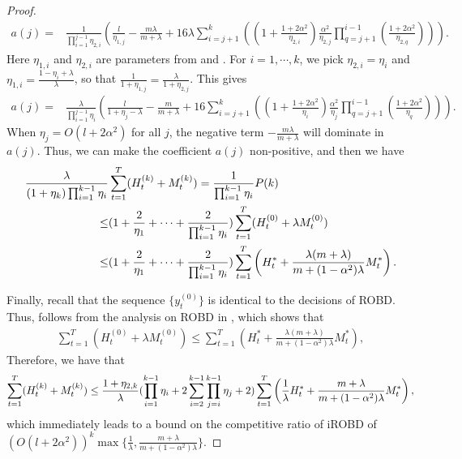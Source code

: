 \begin{proof}
\begin{align}
    a(j)=&\frac{1}{\prod_{i=1}^{j-1}\eta_{2,i}}\left(\frac{l}{\eta_{1,j}}-\frac{m\lambda}{m+\lambda}+16\lambda\sum_{i=j+1}^k\left(\left(1+\frac{1+2\alpha^2}{\eta_{2,i}}\right)\frac{\alpha^2}{\eta_{2,j}}\prod_{q=j+1}^{i-1}\left(\frac{1+2\alpha^2}{\eta_{2,q}}\right)\right)\right).
\end{align}
Here $\eta_{1,i}$ and $\eta_{2,i}$ are parameters from  and . For $i=1,\cdots,k$, we pick $\eta_{2,i}=\eta_{i}$ and $\eta_{1,i}=\frac{1-\eta_{i}+\lambda}{\lambda}$, so that $\frac{1}{1+\eta_{1,j}}=\frac{\lambda}{1+\eta_{2,j}}$. This gives
\begin{align}\label{a.a.coefficient}
    a(j)=&\frac{\lambda}{\prod_{i=1}^{j-1}\eta_{i}}\left(\frac{l}{1+\eta_{j}-\lambda}-\frac{m}{m+\lambda}+16\sum_{i=j+1}^k\left(\left(1+\frac{1+2\alpha^2}{\eta_{i}}\right)\frac{\alpha^2}{\eta_{j}}\prod_{q=j+1}^{i-1}\left(\frac{1+2\alpha^2}{\eta_{q}}\right)\right)\right).
\end{align}
When $\eta_{j}=O(l+2\alpha^2)$ for all $j$, the negative term $-\frac{m\lambda}{m+\lambda}$ will dominate in $a(j)$. Thus, we can make the coefficient $a(j)$ non-positive, and then we have
\begin{subequations}
\begin{align}
    \frac{\lambda}{(1+\eta_{k})\prod_{i=1}^{k-1}\eta_{i}}&\sum_{t=1}^T(H_t^{(k)}+M_t^{(k)})
=\frac{1}{\prod_{i=1}^{k-1}\eta_{i}}P(k)\notag\\
\le&(1+\frac{2}{\eta_{1}}+\cdots+\frac{2}{\prod_{i=1}^{k-1}\eta_{i}})\sum_{t=1}^T(H_t^{(0)}+\lambda M_t^{(0)})\notag\\
\le&(1+\frac{2}{\eta_{1}}+\cdots+\frac{2}{\prod_{i=1}^{k-1}\eta_{i}})\sum_{t=1}^T\left(H_t^*+\frac{\lambda(m+\lambda)}{m+(1-\alpha^2)\lambda}M_t^*\right).\label{appendix.a.last}
\end{align}
\end{subequations}

Finally, recall that the sequence $\{y_t^{(0)}\}$ is identical to the decisions of ROBD. Thus,  follows from the analysis on ROBD in \citep{shi2020online}, which shows that
\begin{align}\label{appendix.a.5}
    \sum_{t=1}^T(H_t^{(0)}+\lambda M_t^{(0)})\le\sum_{t=1}^T\left(H_t^*+\frac{\lambda(m+\lambda)}{m+(1-\alpha^2)\lambda}M_t^*\right),
\end{align}
Therefore, we have that
\begin{align}
    \sum_{t=1}^T(H_t^{(k)}+M_t^{(k)})\le\frac{1+\eta_{2,k}}{\lambda}(\prod_{i=1}^{k-1}\eta_{i}+2\sum_{i=2}^{k-1}\prod_{j=i}^{k-1}\eta_{j}+2)\sum_{t=1}^T\left(\frac{1}{\lambda}H_t^*+\frac{m+\lambda}{m+(1-\alpha^2)\lambda}M_t^*\right),\notag
\end{align}
which immediately leads to a bound on the competitive ratio of iROBD of $(O(l+2\alpha^2))^k\max\{\frac{1}{\lambda},\frac{m+\lambda}{m+(1-\alpha^2)\lambda}\}$.

\end{proof}




